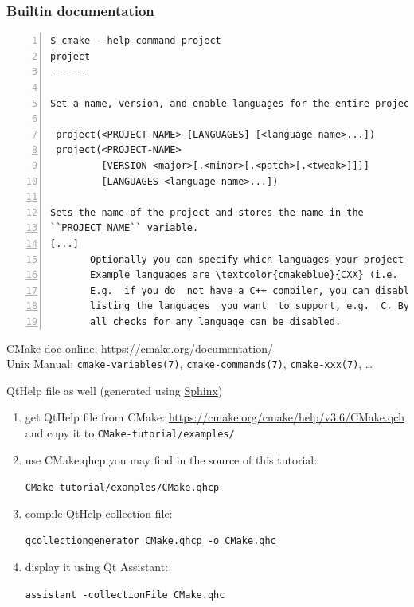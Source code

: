 \documentclass[compress,slidestop,table
              ]
               {beamer}
\begin{document}
\begin{frame}
\frametitle{Builtin documentation}
\begin{Verbatim}[commandchars=\\\{\},fontsize=\tiny,numbers=left,frame=topline,label=CMake builtin doc for 'project' command]
  $ cmake --help-command project
project
-------

Set a name, version, and enable languages for the entire project.

 project(<PROJECT-NAME> [LANGUAGES] [<language-name>...])
 project(<PROJECT-NAME>
         [VERSION <major>[.<minor>[.<patch>[.<tweak>]]]]
         [LANGUAGES <language-name>...])

Sets the name of the project and stores the name in the
``PROJECT_NAME`` variable.
[...]
       Optionally you can specify which languages your project supports.
       Example languages are \textcolor{cmakeblue}{CXX} (i.e.  C++), \textcolor{cmakeblue}{C}, \textcolor{cmakeblue}{Fortran}, etc.  By \textcolor{cmakered}{default C} \textcolor{cmakered}{and CXX are enabled}.
       E.g.  if you do  not have a C++ compiler, you can disable the check  for it by  explicitly
       listing the languages  you want  to support, e.g.  C. By using the special language "\textcolor{cmakeblue}{NONE}"
       all checks for any language can be disabled.
\end{Verbatim}
CMake doc online: \url{https://cmake.org/documentation/}\\
Unix Manual: {\scriptsize \texttt{cmake-variables(7)}, \texttt{cmake-commands(7)}, \texttt{cmake-xxx(7)}, \ldots}

QtHelp file as well (generated using \href{http://www.sphinx-doc.org/en/stable/builders.html}{Sphinx})
\begin{enumerate}
\item get QtHelp file from CMake: \url{https://cmake.org/cmake/help/v3.6/CMake.qch} and copy it to \texttt{CMake-tutorial/examples/}
\item use CMake.qhcp you may find in the source of this tutorial:

  \texttt{CMake-tutorial/examples/CMake.qhcp}
\item compile QtHelp collection file:

  \texttt{qcollectiongenerator CMake.qhcp -o CMake.qhc}
\item display it using Qt Assistant:

  \texttt{assistant -collectionFile CMake.qhc}
\end{enumerate}
\end{frame}
\end{document}
